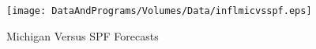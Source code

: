\begin{figure}
 \centerline{\texttt{[image: DataAndPrograms/Volumes/Data/inflmicvsspf.eps]}}%
 \caption{Michigan Versus SPF Forecasts}
 \label{fig:inflfigs}
\end{figure}
